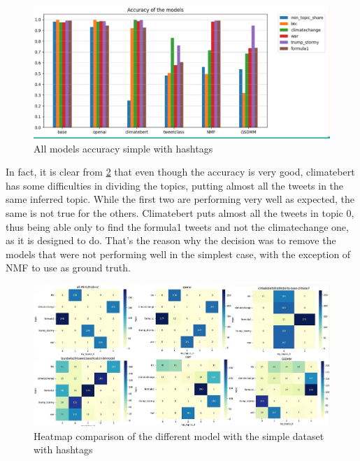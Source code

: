 \begin{figure}[h]
    \centering %
        \includegraphics[width=0.99\linewidth]{Chapter4/figures/topic_supervised_bar.png} 
    \caption{All models accuracy simple  with hashtags
    }
    \label{figure:supervised bar} %
\end{figure}

In fact, it is clear from  \ref{figure:sup_heatmap1_simple_hash} that even though the accuracy is very good, climatebert has some difficulties in dividing the topics, putting almost all the tweets in the same inferred topic. While the first two are performing very well as expected, the same is not true for the others.  Climatebert puts almost all the tweets in topic 0, thus being able only to find the formula1 tweets and not the climatechange one, as it is designed to do. That’s the reason why the decision was to remove the models that were not performing well in the simplest case, with the exception of NMF to use as ground truth.


\begin{figure}[h]
    \centering %
        \includegraphics[width=0.99\linewidth]{Chapter4/figures/heatmaps_eval.jpeg} 
    \caption{Heatmap comparison of the different model with the simple dataset with hashtags
    }
    \label{figure:sup_heatmap1_simple_hash} %
\end{figure}

